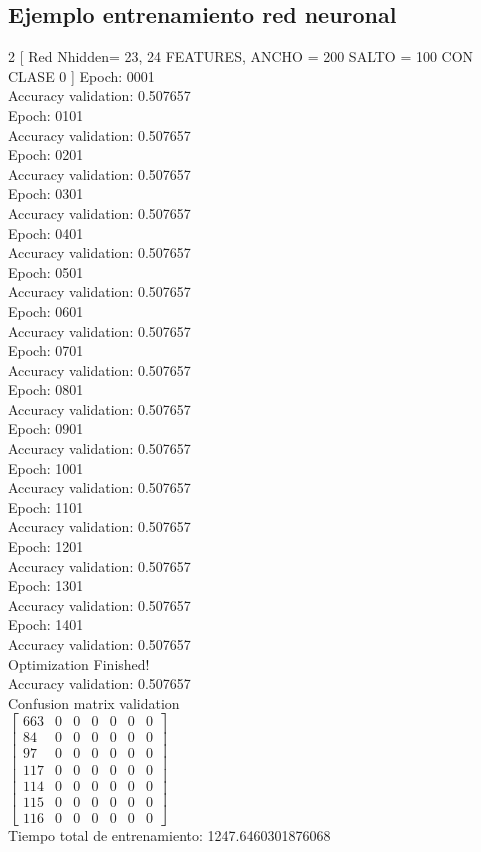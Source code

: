\subsection*{Ejemplo entrenamiento red neuronal}
\begin{multicols}{2}
[ Red Nhidden= 23, 24 FEATURES, ANCHO = 200 SALTO = 100 CON CLASE 0
]
Epoch: 0001 \\
Accuracy validation: 0.507657\\
Epoch: 0101\\
Accuracy validation: 0.507657\\
Epoch: 0201\\
Accuracy validation: 0.507657\\
Epoch: 0301 \\
Accuracy validation: 0.507657 \\
Epoch: 0401 \\
Accuracy validation: 0.507657 \\
Epoch: 0501 \\
Accuracy validation: 0.507657 \\ 
Epoch: 0601 \\
Accuracy validation: 0.507657 \\
Epoch: 0701 \\
Accuracy validation: 0.507657 \\
Epoch: 0801 \\
Accuracy validation: 0.507657 \\
Epoch: 0901 \\ 
Accuracy validation: 0.507657 \\
Epoch: 1001 \\ 
Accuracy validation: 0.507657 \\
Epoch: 1101 \\
Accuracy validation: 0.507657 \\
Epoch: 1201 \\
Accuracy validation: 0.507657 \\
Epoch: 1301 \\
Accuracy validation: 0.507657 \\ 
Epoch: 1401 \\
Accuracy validation: 0.507657 \\
Optimization Finished! \\ 
Accuracy validation: 0.507657 \\
Confusion matrix validation \\
$\begin{bmatrix}
663 & 0 & 0 & 0 & 0 & 0 & 0 \\ 
84 & 0 & 0 & 0 & 0 & 0 & 0 \\ 
97 & 0 & 0 & 0 & 0  & 0 & 0 \\ 
117 & 0 & 0 & 0 & 0 & 0 & 0 \\ 
114 & 0 & 0 & 0 & 0 & 0 & 0 \\ 
115 & 0 & 0 & 0 & 0 & 0 & 0 \\ 
116 & 0 & 0 & 0 & 0 & 0 & 0
\end{bmatrix}$ \\
Tiempo total de entrenamiento: 1247.6460301876068\\
\end{multicols}

